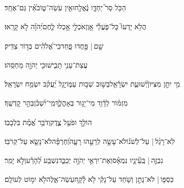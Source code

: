 \documentclass[12pt]{article}
\newcommand{\loc}[1]{\textsuperscript{\locf{#1}}}
\begin{document}
{\loc{ ג}~}‏הַכֹּ֥ל סָר֮ יַחְדָּ֢ו נֶ֫אֱלָ֥חוּ{\hfill}אֵ֤ין עֹֽשֵׂה־ט֑וֹב\newline\hspace*{.5em}אֵ֝֗ין גַּם־אֶחָֽד׃\par

{\loc{ ד}~}‏הֲלֹ֥א יָדְעוּ֮ כׇּל־פֹּ֢עֲלֵ֫י אָ֥וֶן{\hfill}אֹכְלֵ֣י  אָ֣כְלוּ לֶ֑חֶם\newline\hspace*{.5em}יְ֝הֹוָ֗ה לֹ֣א קָרָֽאוּ׃\par

{\loc{ ה}~}‏שָׁ֤ם |  פָּ֣חֲדוּ פָ֑חַד{\hfill}כִּֽי־אֱ֝לֹהִ֗ים בְּד֣וֹר צַדִּֽיק׃\par

{\loc{ ו}~}‏עֲצַת־עָנִ֥י תָבִ֑ישׁוּ{\hfill}כִּ֖י יְהֹוָ֣ה מַחְסֵֽהוּ׃\par

{\loc{ ז}~}‏מִ֥י יִתֵּ֣ן מִצִּיּוֹן֮{\hfill}יְשׁוּעַ֢ת יִשְׂרָ֫אֵ֥ל\newline\hspace*{.5em}בְּשׁ֣וּב  שְׁב֣וּת עַמּ֑וֹ{\hfill}יָגֵ֥ל יַ֝עֲקֹ֗ב יִשְׂמַ֥ח יִשְׂרָאֵֽל׃\par\pend
\ledpb
\pstart[\subsection*{\textcolor{red}{פרק טו}}]\label{פרק טו}
{\loc{ א}~}‏מִזְמ֗וֹר לְדָ֫וִ֥ד\newline\hspace*{.5em} מִי־יָג֣וּר בְּאָהֳלֶ֑ךָ{\hfill}מִֽי־יִ֝שְׁכֹּ֗ן\hspace{1em}בְּהַ֣ר קׇדְשֶֽׁךָ׃\par

{\loc{ ב}~}‏הוֹלֵ֣ךְ  וּפֹעֵ֥ל צֶ֑דֶק{\hfill}וְדֹבֵ֥ר אֱ֝מֶ֗ת בִּלְבָבֽוֹ׃\par

{\loc{ ג}~}‏לֹֽא־רָגַ֨ל |  עַל־לְשֹׁנ֗וֹ{\hfill}לֹא־עָשָׂ֣ה לְרֵעֵ֣הוּ רָעָ֑ה\newline\hspace*{.5em}וְ֝חֶרְפָּ֗ה{\hfill}לֹא־נָשָׂ֥א עַל־קְרֹבֽוֹ׃\par

{\loc{ ד}~}‏נִבְזֶ֤ה |  בְּֽעֵ֘ינָ֤יו נִמְאָ֗ס{\hfill}וְאֶת־יִרְאֵ֣י יְהֹוָ֣ה יְכַבֵּ֑ד\newline\hspace*{.5em}נִשְׁבַּ֥ע לְ֝הָרַ֗ע{\hfill}וְלֹ֣א יָמִֽר׃\par

{\loc{ ה}~}‏כַּסְפּ֤וֹ |  לֹא־נָתַ֣ן {\hfill}וְשֹׁ֥חַד עַל־נָקִ֗י לֹ֥א לָ֫קָ֥ח\newline\hspace*{.5em}עֹֽשֵׂה־אֵ֑לֶּה{\hfill}לֹ֖א יִמּ֣וֹט לְעוֹלָֽם׃\par\pend
\end{document}
